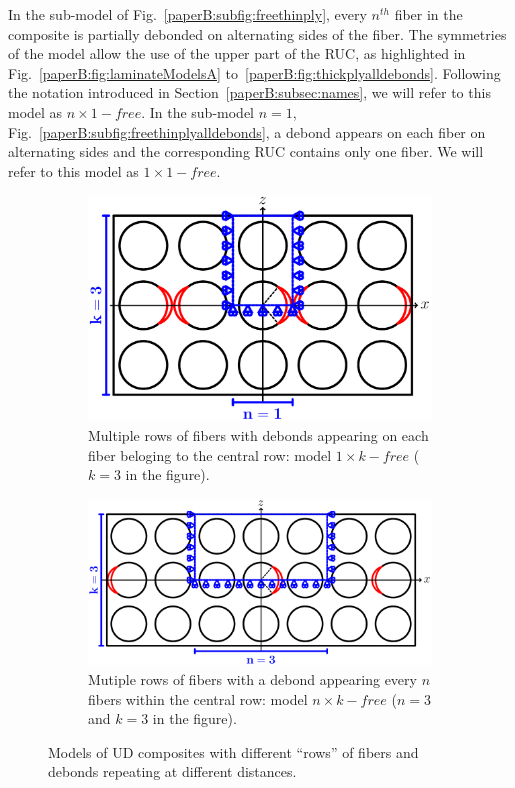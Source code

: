 In the sub-model of Fig.~\ref{paperB:subfig:freethinply}, every $n^{th}$ fiber in the composite is partially debonded on alternating sides of the fiber. The symmetries of the model allow the use of the upper part of the RUC, as highlighted in Fig.~\ref{paperB:fig:laminateModelsA} to~\ref{paperB:fig:thickplyalldebonds}. Following the notation introduced in Section~\ref{paperB:subsec:names}, we will refer to this model as $n\times 1-free$. In the sub-model $n=1$, Fig.~\ref{paperB:subfig:freethinplyalldebonds}, a debond appears on each fiber on alternating sides and the corresponding RUC contains only one fiber. We will refer to this model as $1\times 1-free$.

\begin{figure}[!h]
\centering
    \begin{subfigure}[b]{0.9\textwidth}
    \centering
        \includegraphics[height=0.3\textheight]{paperB/thickPlycentraldebondsline.pdf}
        \caption{Multiple rows of fibers with debonds appearing on each fiber beloging to the central row: model $1\times k-free$ ($k=3$ in the figure).}\label{paperB:subfig:thickplycentraldebonds}
    \end{subfigure}

    \begin{subfigure}[b]{0.9\textwidth}
        \includegraphics[width=\textwidth]{paperB/thickPly.pdf}
        \caption{Mutiple rows of fibers with a debond appearing every $n$ fibers within the central row: model $n\times k-free$ ($n=3$ and $k=3$ in the figure).}\label{paperB:subfig:thickply}
    \end{subfigure}

\caption{Models of UD composites with different ``rows'' of fibers and debonds repeating at different distances.}\label{paperB:fig:laminateModelsB}
\end{figure}

